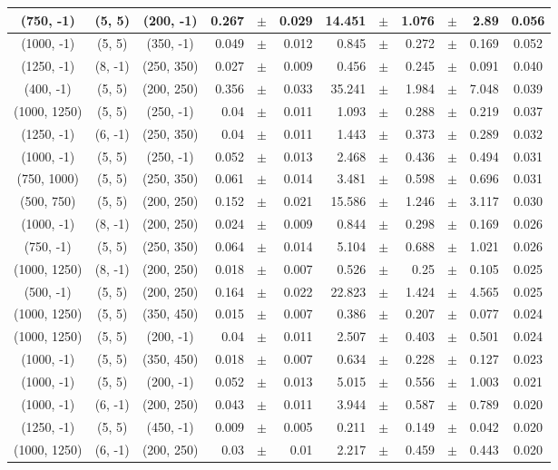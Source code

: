\documentclass[12pt]{paper}
\begin{document}
\begin{table}[ht]
\begin{center}
{\begin{tabular}{|c|c|c|rrr|rrrrr|c|}
(750, -1)&(5, 5)&(200, -1)&0.267&$\pm$&0.029&14.451&$\pm$&1.076&$\pm$&2.89&0.056\\\hline
(1000, -1)&(5, 5)&(350, -1)&0.049&$\pm$&0.012&0.845&$\pm$&0.272&$\pm$&0.169&0.052\\\hline
(1250, -1)&(8, -1)&(250, 350)&0.027&$\pm$&0.009&0.456&$\pm$&0.245&$\pm$&0.091&0.040\\\hline
(400, -1)&(5, 5)&(200, 250)&0.356&$\pm$&0.033&35.241&$\pm$&1.984&$\pm$&7.048&0.039\\\hline
(1000, 1250)&(5, 5)&(250, -1)&0.04&$\pm$&0.011&1.093&$\pm$&0.288&$\pm$&0.219&0.037\\\hline
(1250, -1)&(6, -1)&(250, 350)&0.04&$\pm$&0.011&1.443&$\pm$&0.373&$\pm$&0.289&0.032\\\hline
(1000, -1)&(5, 5)&(250, -1)&0.052&$\pm$&0.013&2.468&$\pm$&0.436&$\pm$&0.494&0.031\\\hline
(750, 1000)&(5, 5)&(250, 350)&0.061&$\pm$&0.014&3.481&$\pm$&0.598&$\pm$&0.696&0.031\\\hline
(500, 750)&(5, 5)&(200, 250)&0.152&$\pm$&0.021&15.586&$\pm$&1.246&$\pm$&3.117&0.030\\\hline
(1000, -1)&(8, -1)&(200, 250)&0.024&$\pm$&0.009&0.844&$\pm$&0.298&$\pm$&0.169&0.026\\\hline
(750, -1)&(5, 5)&(250, 350)&0.064&$\pm$&0.014&5.104&$\pm$&0.688&$\pm$&1.021&0.026\\\hline
(1000, 1250)&(8, -1)&(200, 250)&0.018&$\pm$&0.007&0.526&$\pm$&0.25&$\pm$&0.105&0.025\\\hline
(500, -1)&(5, 5)&(200, 250)&0.164&$\pm$&0.022&22.823&$\pm$&1.424&$\pm$&4.565&0.025\\\hline
(1000, 1250)&(5, 5)&(350, 450)&0.015&$\pm$&0.007&0.386&$\pm$&0.207&$\pm$&0.077&0.024\\\hline
(1000, 1250)&(5, 5)&(200, -1)&0.04&$\pm$&0.011&2.507&$\pm$&0.403&$\pm$&0.501&0.024\\\hline
(1000, -1)&(5, 5)&(350, 450)&0.018&$\pm$&0.007&0.634&$\pm$&0.228&$\pm$&0.127&0.023\\\hline
(1000, -1)&(5, 5)&(200, -1)&0.052&$\pm$&0.013&5.015&$\pm$&0.556&$\pm$&1.003&0.021\\\hline
(1000, -1)&(6, -1)&(200, 250)&0.043&$\pm$&0.011&3.944&$\pm$&0.587&$\pm$&0.789&0.020\\\hline
(1250, -1)&(5, 5)&(450, -1)&0.009&$\pm$&0.005&0.211&$\pm$&0.149&$\pm$&0.042&0.020\\\hline
(1000, 1250)&(6, -1)&(200, 250)&0.03&$\pm$&0.01&2.217&$\pm$&0.459&$\pm$&0.443&0.020\\\hline

\end{tabular}}
\end{center}
\end{table}
\end{document}
